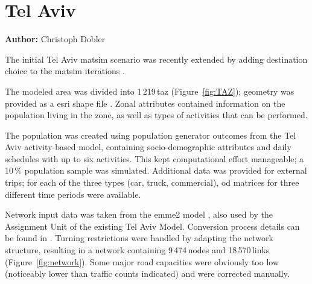 \chapter{Tel Aviv}
\label{ch:telaviv}
\hfill \textbf{Author:} Christoph Dobler


The initial Tel Aviv \gls{matsim} scenario \citep[][]{BekhorEtAl_TRB_2011} was recently extended by adding destination choice to the \gls{matsim} iterations \citep[][]{DoblerEtAl_TechRep_IVT_2014}.

The modeled area was divided into 1\,219\,\gls{taz} (Figure~\ref{fig:TAZ}); geometry was provided as a \gls{esri} shape file \citep{ESRI-ShapeFile_manual_1998}. Zonal attributes contained information on the population living in the zone, as well as types of activities that can be performed.

The population was created using population generator outcomes from the Tel Aviv activity-based model, containing socio-demographic attributes and daily schedules with up to six activities. This kept computational effort manageable; a 10\,\% population sample was simulated. Additional data was provided for external trips; for each of the three types (car, truck, commercial), \gls{od} matrices for three different time periods were available.

Network input data was taken from the \gls{emme2} model \citep[see][]{EMME_Webpage_2011}, also used by the Assignment Unit of the existing Tel Aviv Model. Conversion process details can be found in \citet{GaoWEtAl_TRR_2010}. Turning restrictions were handled by adapting the network structure, resulting in a network containing 9\,474\,nodes and 18\,570\,links (Figure~\ref{fig:network}). Some major road capacities were obviously too low (\eg noticeably lower than traffic counts indicated) and were corrected manually.

